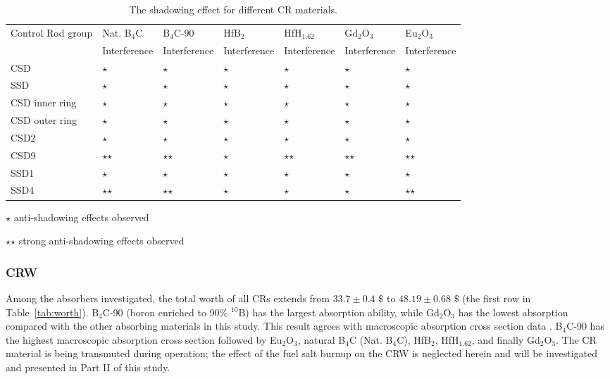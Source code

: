 \begin{sidewaystable}
	\fontsize{5}{7}\selectfont
	\centering
	\caption{The shadowing effect for different CR materials.}
	\vspace{0.1in}
		\begin{tabularx}{\textwidth}{|X|X|X|X|X|X|X|}
		\hline
		\multirow{2}{*}{Control Rod group}		& Nat. B$_4$C & B$_4$C-90  	&HfB$_2$
		&HfH$_{1.62}$
		&Gd$_2$O$_3$& 	
		Eu$_2$O$_3$ \\
		\cline{2-7}
		&  Interference
		& Interference	
		& Interference	
		& Interference	
		& Interference
		& Interference \\
		\hline                   
	CSD 		&	$\star$				& $\star$	&$\star$		&$\star$		&$\star$  &$\star$	 \\
	\hline 
	SSD		   &	$\star$				& $\star$	&$\star$		&$\star$		&$\star$  &$\star$	 \\ 
	\hline 
	CSD inner ring   &  	$\star$				& $\star$	&$\star$		&$\star$		&$\star$  &$\star$	 \\
	\hline 
	CSD outer ring       &	$\star$				& $\star$	&$\star$		&$\star$		&$\star$  &$\star$	 \\     
	\hline 
	CSD2			&	$\star$				& $\star$	&$\star$		&$\star$		&$\star$  &$\star$	 \\  
	\hline 
	CSD9		&	$\star$$\star$				& $\star$$\star$	&$\star$		&$\star$$\star$			&$\star$$\star$	  &$\star$$\star$		 \\ 	 
	\hline
	SSD1	&	$\star$				& $\star$	&$\star$		&$\star$		&$\star$  &$\star$ \\	  
	\hline 
	SSD4		&		$\star$$\star$			& 	$\star$$\star$	&$\star$		&$\star$		&$\star$  &	$\star$$\star$	 \\  
	\hline
	\end{tabularx}
	\begin{tablenotes}
	\tiny
	\item  $\star$  anti-shadowing effects observed
	\item  $\star$$\star$ strong anti-shadowing effects observed
\end{tablenotes}
	\label{tab:table25}
\end{sidewaystable}
\subsubsection{CRW} \label{CR_worth}

Among the absorbers investigated, the total worth of all CRs extends from $33.7\pm0.4$ $\$$ to $48.19\pm0.68$ 
$\$$ (the first row in Table~\ref{tab:worth}). B$_4$C-90 (boron enriched to 90\% $^{10}$B)
has the largest absorption ability, while Gd$_2$O$_3$ has the lowest 
absorption compared with the other absorbing materials in this study. This 
result agrees with macroscopic absorption cross section data 
\cite{guo2019optimized}. B$_4$C-90 has the highest macroscopic 
absorption cross section followed by Eu$_2$O$_3$, natural B$_4$C (Nat. B$_4$C), HfB$_2$, HfH$_{1.62}$, and 
finally Gd$_2$O$_3$. The CR material is being transmuted during 
operation; the effect of the fuel salt burnup on the CRW is neglected
herein and will be investigated and presented in Part II of this 
study.

